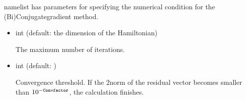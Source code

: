 \documentclass[letterpaper,10pt,dvipdfmx,openany,english]{sphinxmanual}
\begin{document}
 namelist has parameters
for specifying the numerical condition for the
(Bi)Conjugate\sphinxhyphen{}gradient method.
\begin{itemize}
\item {} 

 int (default: the dimension of the Hamiltonian)

 The maximum number of iterations.

\item {} 

 int (default: )

 Convergence threshold.
If the 2\sphinxhyphen{}norm of the residual vector becomes smaller than
\(10^{-{\tt Convfactor}}\), the calculation finishes.

\end{itemize}
\end{document}
